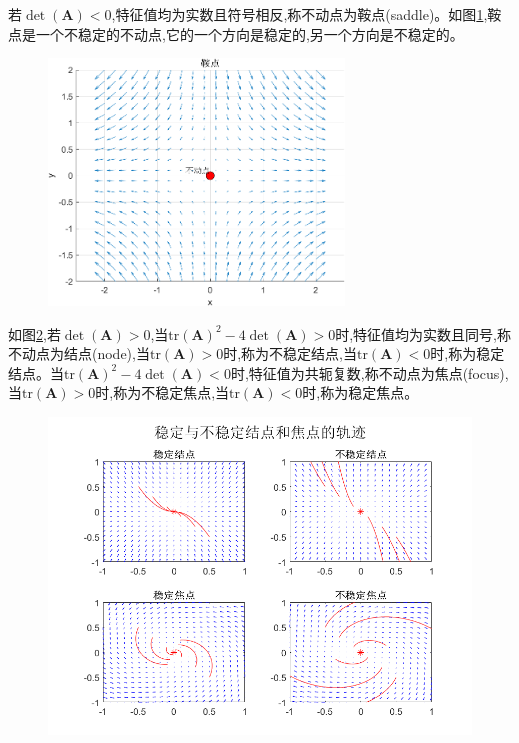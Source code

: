 若$\det(\mathbf{A})<0$,特征值均为实数且符号相反,称不动点为鞍点(saddle)。如图\ref{fig:saddle},鞍点是一个不稳定的不动点,它的一个方向是稳定的,另一个方向是不稳定的。
\begin{figure}[H]
    \centering
    \includegraphics[width=0.7\textwidth]{Img/saddle.png}
    \label{fig:saddle}
\end{figure}

如图\ref{fig:node},若$\det(\mathbf{A})>0$,当$\text{tr}(\mathbf{A})^2-4\det(\mathbf{A})>0$时,特征值均为实数且同号,称不动点为结点(node),当$\text{tr}(\mathbf{A})>0$时,称为不稳定结点,当$\text{tr}(\mathbf{A})<0$时,称为稳定结点。当$\text{tr}(\mathbf{A})^2-4\det(\mathbf{A})<0$时,特征值为共轭复数,称不动点为焦点(focus),当$\text{tr}(\mathbf{A})>0$时,称为不稳定焦点,当$\text{tr}(\mathbf{A})<0$时,称为稳定焦点。

\begin{figure}[H]
    \centering
    \includegraphics[width=.7\linewidth]{Img/node.png}
    \label{fig:node}
\end{figure}

